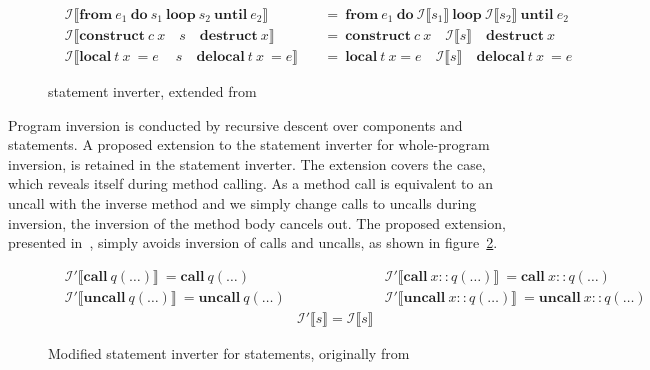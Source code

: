 \begin{figure}[ht]
\begin{align*}
        &\mathcal{I} \llbracket \textbf{from}\ e_1\ \textbf{do}\ s_1\ \textbf{loop}\ s_2\ \textbf{until}\ e_2 \rrbracket\ &&=\ \textbf{from}\ e_1\ \textbf{do}\ \mathcal{I}\llbracket s_1 \rrbracket\ \textbf{loop}\ \mathcal{I}\llbracket s_2 \rrbracket\ \textbf{until}\ e_2\\
        &\mathcal{I} \llbracket\textbf{construct}\ c\ x\quad s\quad \textbf{destruct}\ x\rrbracket\ &&=\ \textbf{construct}\ c\ x\quad\mathcal{I}\llbracket s \rrbracket\quad\textbf{destruct}\ x\\
        &\mathcal{I} \llbracket\textbf{local}\ t\ x\ = e\ \quad s\quad \textbf{delocal}\ t\ x\ = e\rrbracket\ &&=\ \textbf{local}\ t\ x = e \quad\mathcal{I}\llbracket s \rrbracket\quad\textbf{delocal}\ t\ x\ = e
    \end{align*}
    \caption{\rooplpp statement inverter, extended from~\cite{th:roopl}}
    \label{fig:statement-inverter}
\end{figure}

Program inversion is conducted by recursive descent over components and statements. A proposed extension to the statement inverter for whole-program inversion, is retained in the \rooplpp statement inverter. The extension covers the case, which reveals itself during method calling. As a method call is equivalent to an uncall with the inverse method and we simply change calls to uncalls during inversion, the inversion of the method body cancels out. The proposed extension, presented in~\cite{ty:janus, th:roopl}, simply avoids inversion of calls and uncalls, as shown in figure~\ref{fig:inverter-extension}.

\begin{figure}[ht]    
    \centering
    \begin{align*}
        &\mathcal{I}' \llbracket \textbf{call}\ q(\dots) \rrbracket\ = \textbf{call}\ q(\dots) &&\mathcal{I}' \llbracket \textbf{call}\ x::q(\dots) \rrbracket\ = \textbf{call}\ x::q(\dots)\\
        &\mathcal{I}' \llbracket \textbf{uncall}\ q(\dots) \rrbracket\ = \textbf{uncall}\ q(\dots) &&\mathcal{I}' \llbracket \textbf{uncall}\ x::q(\dots) \rrbracket\ = \textbf{uncall}\ x::q(\dots)\\ 
        &&\mathcal{I}' \llbracket s \rrbracket = \mathcal{I} \llbracket s \rrbracket
    \end{align*}
    \caption{Modified statement inverter for statements, originally from~\cite{th:roopl}}
    \label{fig:inverter-extension} 
\end{figure}

